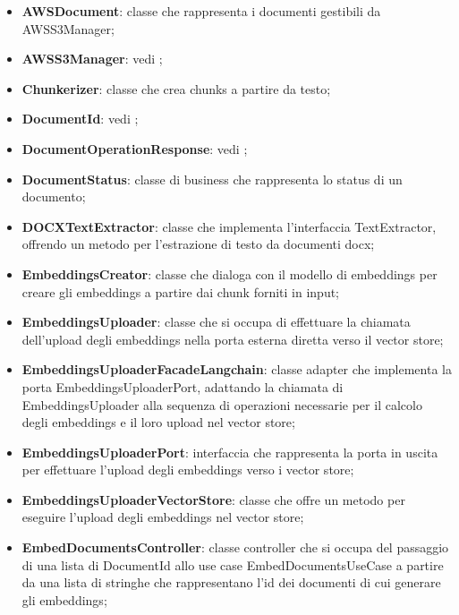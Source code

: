 \documentclass[10pt, a4paper]{article}
\begin{document}
\begin{itemize}
    \item \label{AWSDocument}\textbf{AWSDocument}: classe che rappresenta i documenti gestibili da AWSS3Manager;
    \item \textbf{AWSS3Manager}: vedi ;
    \item \label{Chunkerizer}\textbf{Chunkerizer}: classe che crea chunks a partire da testo;
    \item \textbf{DocumentId}: vedi ;
    \item \textbf{DocumentOperationResponse}: vedi ;
    \item \label{DocumentStatus} \textbf{DocumentStatus}: classe di business che rappresenta lo status di un documento;
    \item \label{DOCXTextExtractor}\textbf{DOCXTextExtractor}: classe che implementa l'interfaccia TextExtractor, offrendo un metodo per l'estrazione di testo da documenti docx;
    \item  \label{EmbeddingsCreator}\textbf{EmbeddingsCreator}: classe che dialoga con il modello di embeddings per creare gli embeddings a partire dai chunk forniti in input;
    \item \label{EmbeddingsUploader}\textbf{EmbeddingsUploader}: classe che si occupa di effettuare la chiamata dell'upload degli embeddings nella porta esterna diretta verso il vector store;
    \item \label{EmbeddingsUploaderFacadeLangchain}\textbf{EmbeddingsUploaderFacadeLangchain}: classe adapter che implementa la porta EmbeddingsUploaderPort, adattando la chiamata di EmbeddingsUploader alla sequenza di operazioni necessarie per il calcolo degli embeddings e il loro upload nel vector store;
    \item \label{EmbeddingsUploaderPort}\textbf{EmbeddingsUploaderPort}: interfaccia che rappresenta la porta in uscita per effettuare l'upload degli embeddings verso i vector store;
    \item \label{EmbeddingsUploaderVectorStore}\textbf{EmbeddingsUploaderVectorStore}: classe che offre un metodo per eseguire l'upload degli embeddings nel vector store;
    \item \label{EmbedDocumentsController}\textbf{EmbedDocumentsController}: classe controller che si occupa del passaggio di una lista di DocumentId allo use case EmbedDocumentsUseCase a partire da una lista di stringhe che rappresentano l'id dei documenti di cui generare gli embeddings;

\end{itemize}
\end{document}
